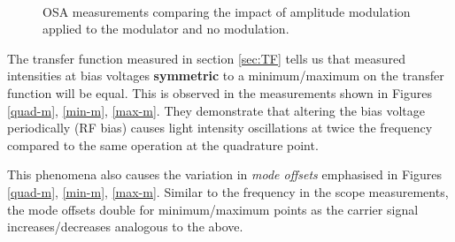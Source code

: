 \documentclass[12pt,a4paper]{report}
\begin{document}
\begin{figure}
    \centering
    \quad
    \\
    \vspace{0.45cm}
    \caption{OSA measurements comparing the impact of amplitude modulation applied to the modulator and no modulation.}
    \label{comparison1}
    \vspace{-12pt}
\end{figure}

The transfer function measured in section \ref{sec:TF} tells us that measured intensities at bias voltages \textbf{symmetric} to a minimum/maximum on the transfer function will be equal. This is observed in the measurements shown in Figures \ref{quad-m}, \ref{min-m}, \ref{max-m}. They demonstrate that altering the bias voltage periodically (RF bias) causes light intensity oscillations at twice the frequency compared to the same operation at the quadrature point.

This phenomena also causes the variation in \emph{mode offsets} emphasised in Figures \ref{quad-m}, \ref{min-m}, \ref{max-m}. Similar to the frequency in the scope measurements, the mode offsets double for minimum/maximum points as the carrier signal increases/decreases analogous to the above. 
\end{document}
